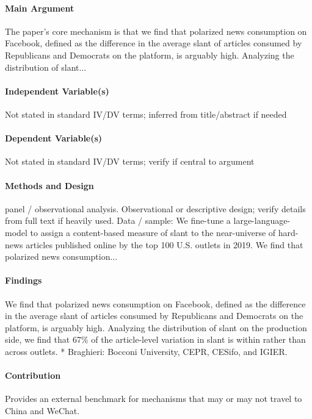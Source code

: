 \documentclass[12pt]{article}
\begin{document}
\paragraph{Main Argument} The paper's core mechanism is that we find that polarized news consumption on Facebook, defined as the difference in the average slant of articles consumed by Republicans and Democrats on the platform, is arguably high. Analyzing the distribution of slant...

\paragraph{Independent Variable(s)} Not stated in standard IV/DV terms; inferred from title/abstract if needed

\paragraph{Dependent Variable(s)} Not stated in standard IV/DV terms; verify if central to argument

\paragraph{Methods and Design} panel / observational analysis. Observational or descriptive design; verify details from full text if heavily used. Data / sample: We fine-tune a large-language-model to assign a content-based measure of slant to the near-universe of hard-news articles published online by the top 100 U.S. outlets in 2019. We find that polarized news consumption...

\paragraph{Findings} We find that polarized news consumption on Facebook, defined as the difference in the average slant of articles consumed by Republicans and Democrats on the platform, is arguably high. Analyzing the distribution of slant on the production side, we find that 67\% of the article-level variation in slant is within rather than across outlets. * Braghieri: Bocconi University, CEPR, CESifo, and IGIER.

\paragraph{Contribution} Provides an external benchmark for mechanisms that may or may not travel to China and WeChat.
\end{document}
